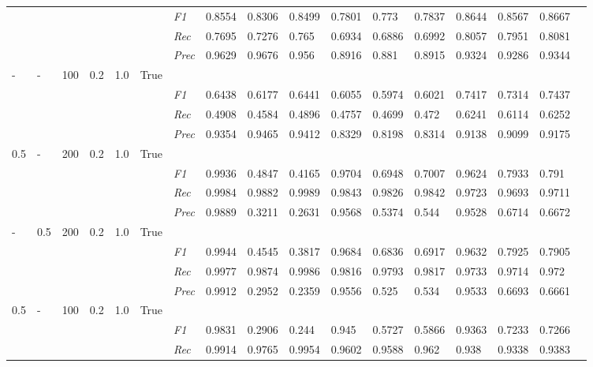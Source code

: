 \begin{table}[]
\begin{tabularx}{\textwidth}{XXXXXX|X|XXX|XXX|XXXX}
& & & & & & \textit{F1} & 0.8554 & 0.8306 & 0.8499 & 0.7801 & 0.773        & 0.7837        & 0.8644        & 0.8567        & 0.8667        \\
& & & & & & \textit{Rec} & 0.7695 & 0.7276 & 0.765    & 0.6934 & 0.6886    & 0.6992    & 0.8057    & 0.7951    & 0.8081    \\
& & & & & & \textit{Prec} & 0.9629 & 0.9676 & 0.956 & 0.8916 & 0.881 & 0.8915 & 0.9324 & 0.9286 & 0.9344 \\ \midrule
- & - & 100 & 0.2 & 1.0 &True & & & & & & & & & \\
& & & & & & \textit{F1} & 0.6438 & 0.6177 & 0.6441 & 0.6055 & 0.5974        & 0.6021        & 0.7417        & 0.7314        & 0.7437        \\
& & & & & & \textit{Rec} & 0.4908 & 0.4584 & 0.4896    & 0.4757 & 0.4699    & 0.472    & 0.6241    & 0.6114    & 0.6252    \\
& & & & & & \textit{Prec} & 0.9354 & 0.9465 & 0.9412 & 0.8329 & 0.8198 & 0.8314 & 0.9138 & 0.9099 & 0.9175 \\ \midrule
0.5 & - & 200 & 0.2 & 1.0 &True & & & & & & & & & \\
& & & & & & \textit{F1} & 0.9936 & 0.4847 & 0.4165 & 0.9704 & 0.6948        & 0.7007        & 0.9624        & 0.7933        & 0.791        \\
& & & & & & \textit{Rec} & 0.9984 & 0.9882 & 0.9989    & 0.9843 & 0.9826    & 0.9842    & 0.9723    & 0.9693    & 0.9711    \\
& & & & & & \textit{Prec} & 0.9889 & 0.3211 & 0.2631 & 0.9568 & 0.5374 & 0.544 & 0.9528 & 0.6714 & 0.6672 \\ \midrule
- & 0.5 & 200 & 0.2 & 1.0 &True & & & & & & & & & \\
& & & & & & \textit{F1} & 0.9944 & 0.4545 & 0.3817 & 0.9684 & 0.6836        & 0.6917        & 0.9632        & 0.7925        & 0.7905        \\
& & & & & & \textit{Rec} & 0.9977 & 0.9874 & 0.9986    & 0.9816 & 0.9793    & 0.9817    & 0.9733    & 0.9714    & 0.972    \\
& & & & & & \textit{Prec} & 0.9912 & 0.2952 & 0.2359 & 0.9556 & 0.525 & 0.534 & 0.9533 & 0.6693 & 0.6661 \\ \midrule
0.5 & - & 100 & 0.2 & 1.0 &True & & & & & & & & & \\
& & & & & & \textit{F1} & 0.9831 & 0.2906 & 0.244 & 0.945 & 0.5727        & 0.5866        & 0.9363        & 0.7233        & 0.7266        \\
& & & & & & \textit{Rec} & 0.9914 & 0.9765 & 0.9954    & 0.9602 & 0.9588    & 0.962    & 0.938    & 0.9338    & 0.9383    \\

\end{tabularx}
\end{table}
